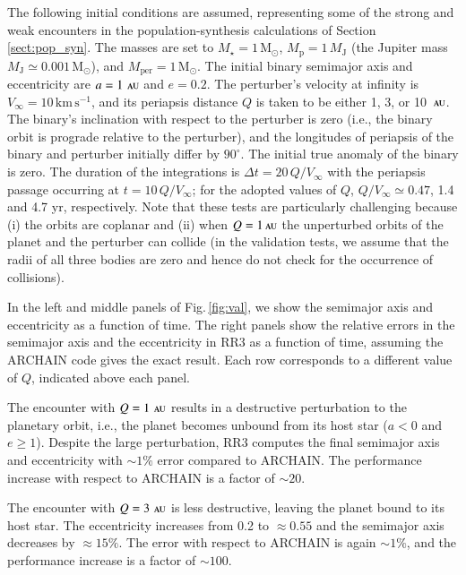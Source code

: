 \documentclass[iop,usenatbib]{emulateapj}
\renewcommand{\S}{Section}
\newcommand{\F}{Fig.}
\newcommand{\msun}{\mathrm{M}_\odot}
\newcommand{\au}{\,\textsc{au}}
\newcommand{\mper}{M_\mathrm{per}}
\begin{document}
The following initial conditions are assumed, representing some of the strong and weak encounters in the population-synthesis calculations of \S\,\ref{sect:pop_syn}. The masses are set to $M_\star = 1\, \msun$, $M_\mathrm{p} = 1 \, M_\mathrm{J}$ (the Jupiter mass $M_\mathrm{J}\simeq0.001\,\msun$), and $\mper = 1\,\msun$. The initial binary semimajor axis and eccentricity are $a = 1\,\au$ and $e=0.2$. The perturber's velocity at infinity is $V_\infty = 10\, \mathrm{km\,s^{-1}}$, and its periapsis distance $Q$ is taken to be either 1, 3, or 10 $\au$. The binary's inclination with respect to the perturber is zero (i.e., the binary orbit is prograde relative to the perturber), and the longitudes of periapsis of the binary and perturber initially differ by $90^\circ$. The initial true anomaly of the binary is zero. The duration of the integrations is $\Delta t = 20 \, Q/V_\infty$ with the periapsis passage occurring at $t=10 \, Q/V_\infty$; for the adopted values of $Q$, $Q/V_\infty \simeq 0.47$, 1.4 and 4.7 yr, respectively. Note that these tests are particularly challenging because (i) the orbits are coplanar and (ii) when $Q=1\au$ the unperturbed orbits of the planet and the perturber can collide (in the validation tests, we assume that the radii of all three bodies are zero and hence do not check for the occurrence of collisions). 

In the left and middle panels of \F\,\ref{fig:val}, we show the semimajor axis and eccentricity as a function of time. The right panels show the relative errors in the semimajor axis and the eccentricity in \textsc{RR3} as a function of time, assuming the \textsc{ARCHAIN} code gives the exact result. Each row corresponds to a different value of $Q$, indicated above each panel. 

The encounter with $Q=1\,\au$ results in a destructive perturbation to the planetary orbit, i.e., the planet becomes unbound from its host star ($a<0$ and $e\geq1$). Despite the large perturbation, \textsc{RR3} computes the final semimajor axis and eccentricity with $\sim 1\%$ error compared to \textsc{ARCHAIN}. The performance increase with respect to \textsc{ARCHAIN} is a factor of $\sim 20$. 

The encounter with $Q=3\,\au$ is less destructive, leaving the planet bound to its host star. The eccentricity increases from 0.2 to $\approx 0.55$ and the semimajor axis decreases by $\approx 15\%$. The error with respect to \textsc{ARCHAIN} is again $\sim 1\%$, and the performance increase is a factor of $\sim 100$. 
\end{document}
